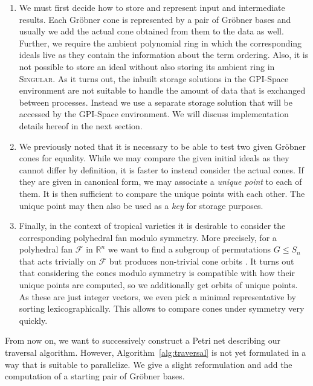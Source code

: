 \documentclass[
  paper=a4,
  titlepage,
  bibliography=totoc,
  listof=totoc,
  pagesize=pdftex
]{scrartcl}
\numberwithin{figure}{section}
\numberwithin{equation}{section}
\numberwithin{table}{section}
\newcommand*\setR{\mathds{R}}
\theoremstyle{definition}
\numberwithin{definition}{section}
\begin{document}
\begin{enumerate}[label=\arabic*.]
  \item We must first decide how to store and represent input and intermediate results.
    Each Gröbner cone is represented by a pair of Gröbner bases and usually we add the
    actual cone obtained from them to the data as well. Further, we require the ambient
    polynomial ring in which the corresponding ideals live as they contain the information
    about the term ordering. Also, it is not possible to store an ideal without also
    storing its ambient ring in \textsc{Singular}. As it turns out, the inbuilt storage
    solutions in the GPI-Space environment are not suitable to handle the amount of data
    that is exchanged between processes. Instead we use a separate storage solution that
    will be accessed by the GPI-Space environment. We will discuss implementation details
    hereof in the next section.
  \item We previously noted that it is necessary to be able to test two given Gröbner
    cones for equality. While we may compare the given initial ideals as they cannot
    differ by definition, it is faster to instead consider the actual cones. If they are
    given in canonical form, we may associate a \emph{unique point} to each of them. It is
    then sufficient to compare the unique points with each other. The unique point may
    then also be used as a \emph{key} for storage purposes.
  \item Finally, in the context of tropical varieties it is desirable to consider the
    corresponding polyhedral fan modulo symmetry. More precisely, for a polyhedral fan
    $\mathcal F$ in $\setR^n$ we want to find a subgroup of permutations $G \leq S_n$ that
    acts trivially on $\mathcal F$ but produces non-trivial cone orbits \cite{JenTravSym}.
    It turns out that considering the cones modulo symmetry is compatible with how their
    unique points are computed, so we additionally get orbits of unique points. As these
    are just integer vectors, we even pick a minimal representative by sorting
    lexicographically. This allows to compare cones under symmetry very quickly.
\end{enumerate}
From now on, we want to successively construct a Petri net describing our traversal
algorithm. However, Algorithm~\ref{alg:traversal} is not yet formulated in a way that is
suitable to parallelize. We give a slight reformulation and add the computation of a
starting pair of Gröbner bases.
\end{document}
